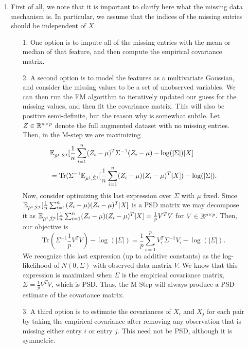 \begin{enumerate}[label=(\alph*)]
\item First of all, we note that it is important to clarify here what the missing data mechanism is. In particular, we assume that the indices of the missing entries should be independent of $X$.

  \begin{enumerate}
  \item[1.] One option is to impute all of the missing entries with the mean or median of that feature, and then compute the empirical covariance matrix. 
  \item[2.] A second option is to model the features as a multivariate Gaussian, and consider the missing values to be a set of unobserved variables. We can then run the EM algorithm to iteratively updated our guess for the missing values, and then fit the covariance matrix. This will also be positive semi-definite, but the reason why is somewhat subtle. Let $Z \in \mathbb{R}^{n \times p}$ denote the full augmented dataset with no missing entries. Then, in the M-step we are maximizing
  \begin{align*}
  & \mathbb{E}_{\hat{\mu}^t,\hat{\Sigma}^t}[\frac{1}{n}\sum_{i=1}^n (Z_i - \mu)^T \Sigma^{-1} (Z_i - \mu) - \log(|\Sigma|)|X] \\
  & = \text{Tr}(\Sigma^{-1} \mathbb{E}_{\hat{\mu}^t,\hat{\Sigma}^t}[\frac{1}{n}\sum_{i=1}^n (Z_i - \mu)(Z_i-\mu)^T|X] ) - \log(|\Sigma|).
  \end{align*}
  Now, consider optimizing this last expression over $\Sigma$ with $\mu$ fixed. Since $\mathbb{E}_{\hat{\mu}^t,\hat{\Sigma}^t}[\frac{1}{n}\sum_{i=1}^n (Z_i - \mu)(Z_i-\mu)^T|X]$ is a PSD matrix we may decompose it as $\mathbb{E}_{\hat{\mu}^t,\hat{\Sigma}^t}[\frac{1}{n}\sum_{i=1}^n (Z_i - \mu)(Z_i-\mu)^T|X] = \frac{1}{p} V^TV$ for $V \in \mathbb{R}^{p \times p}$. Then, our objective is 
  \[
   \text{Tr}(\Sigma^{-1} \frac{1}{p} V^TV ) - \log(|\Sigma|) = \frac{1}{p} \sum_{i=1}^p V_i^T \Sigma^{-1} V_i -  \log(|\Sigma|).
  \] 
  We recognize this last expression (up to additive constants) as the log-likelihood of $N(0,\Sigma)$ with observed data matrix $V$. We know that this expression is maximized when $\Sigma$ is the empirical covariance matrix, $\Sigma = \frac{1}{p} V^TV$, which is PSD. Thus, the M-Step will always produce a PSD estimate of the covariance matrix.
  
  
  \item[3.] A third option is to estimate the covariances of $X_i$ and $X_j$ for each pair by taking the empirical covariance after removing any observation that is missing either entry $i$ or entry $j$. This need not be PSD, although it is symmetric.


\end{enumerate}
\end{enumerate}
